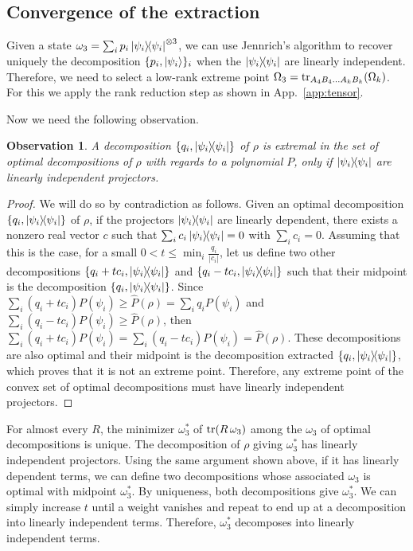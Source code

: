\documentclass[aps,pra,onecolumn,superscriptaddress]{revtex4-2}
\newtheorem{observation}[theorem]{Observation}
\begin{document}
\begin{widetext}
\subsection{Convergence of the extraction}\label{app:extractionConv}
Given a state $\omega_3 = \sum_i p_i \dyad{\psi_i}^{\otimes 3}$, we can use Jennrich's algorithm to recover uniquely the decomposition $\{p_i, \ket{\psi_i}\}_i$ when the $\dyad{\psi_i}$ are linearly independent. Therefore, we need to select a low-rank extreme point $\Omega_3 = \tr_{A_4B_4\dots A_kB_k}(\Omega_k)$. For this we apply the rank reduction step as shown in App.~\ref{app:tensor}.

Now we need the following observation.
\begin{observation}
    A decomposition $\{q_i, \dyad{\psi_i}\}$ of $\rho$ is extremal in the set of optimal decompositions of $\rho$ with regards to a polynomial $P$, only if $\dyad{\psi_i}$ are linearly independent projectors.
\end{observation}
\begin{proof}
We will do so by contradiction as follows. Given an optimal decomposition $\{q_i, \dyad{\psi_i}\}$ of $\rho$, if the projectors $\dyad{\psi_i}$ are linearly dependent, there exists a nonzero real vector $c$ such that $\sum_i c_i \dyad{\psi_i} = 0$ with $\sum_i c_i=0$.
Assuming that this is the case, for a small $0<t\leq \min_i \tfrac{q_i}{|c_i|}$, let us define two other decompositions $\{q_i + t c_i, \dyad{\psi_i}\}$ and $\{q_i - t c_i, \dyad{\psi_i}\}$ such that their midpoint is the decomposition $\{q_i, \dyad{\psi_i}\}$.
Since $\sum_i (q_i+t c_i) P(\psi_i) \geq \widehat{P}(\rho)=\sum_i q_i P(\psi_i)$ and $\sum_i (q_i- t c_i) P(\psi_i) \geq \widehat{P}(\rho)$, then $\sum_i (q_i+ t c_i) P(\psi_i) = \sum_i (q_i- t c_i) P(\psi_i)= \widehat{P}(\rho)$.
These decompositions are also optimal and their midpoint is the decomposition extracted $\{q_i, \dyad{\psi_i}\}$, which proves that it is not an extreme point. Therefore, any extreme point of the convex set of optimal decompositions must have linearly independent projectors.
\end{proof}

For almost every $R$, the minimizer $\omega_3^*$ of $\tr(R\,\omega_3)$ among the $\omega_3$ of optimal decompositions is unique. The decomposition of $\rho$ giving $\omega_3^*$ has linearly independent projectors. Using the same argument shown above, if it has linearly dependent terms, we can define two decompositions whose associated $\omega_3$ is optimal with midpoint $\omega_3^*$. By uniqueness, both decompositions give $\omega_3^*$. We can simply increase $t$ until a weight vanishes and repeat to end up at a decomposition into linearly independent terms. Therefore, $\omega_3^*$ decomposes into linearly independent terms.


\end{widetext}
\end{document}
